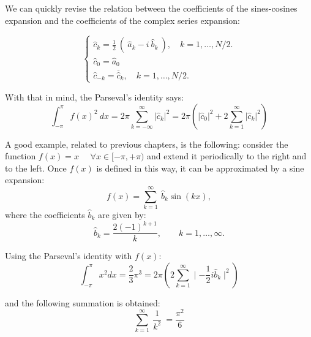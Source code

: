 We can quickly revise the relation between the coefficients of the sines-cosines expansion and the coefficients of the complex series 
expansion:  

$$
\begin{cases}
    \hat{c}_k  =  \frac{1}{2} \ ( \ \hat{a}_k  - i \ \hat{b}_k \ ),  \quad k=1, \ldots, N/2.   \\
    \hat{c}_0  = \hat{a}_0   \\
    \hat{c}_{-k}  =  \overline{ \hat{c} } _{k}  , \quad k=1, \ldots, N/2. 
\end{cases}
$$

With that in mind, the Parseval's identity says:
\begin{equation} 
	\int _{-\pi} ^{\pi} f(x)^2 \ dx =  2 \pi  \sum_{k=-\infty} ^{\infty}  | \hat{c}_k | ^2       =  2 \pi \left(    | \hat{c}_0 |^2 + 2 
	\sum_{k=1} ^{\infty} |  \hat{c}_k  |^2 \right) 
\end{equation} 





A good example, related to previous chapters, is the following: consider the function $ f(x) = x \quad $ $ \forall x \in [-\pi, +\pi ) $ and 
extend it periodically to the right and to the left. Once $ f(x) $ is defined in this way, it can be approximated by a sine expansion: 
\begin{equation} 
	f ( x )  =  \sum_{k=1} ^{\infty} \   \hat{b}_k  \sin \left(  kx\right), 
\end{equation} 
where the coefficients $ \hat{b}_k $ are given by:
\begin{equation} 
    \hat{b}_k   = \frac{ 2 (-1)^{k+1} }{ k }, \qquad k=1, \ldots,\infty. 
\end{equation} 

Using the Parseval's identity with $f(x)$:
$$
\int_{-\pi}^{\pi}  x^2 dx  = \frac{2}{3} \pi^3 = 2\pi \left(   2\sum_{k=1}^{\infty}  \mid  -\frac{1}{2} i \hat{b}_k   \mid ^2  \right)
$$

and the following summation is obtained: 
\begin{equation} 
    \sum_{k=1} ^{\infty} \  \frac{1}{k^2}  \  = \frac{\pi^2}{6}
\end{equation}



